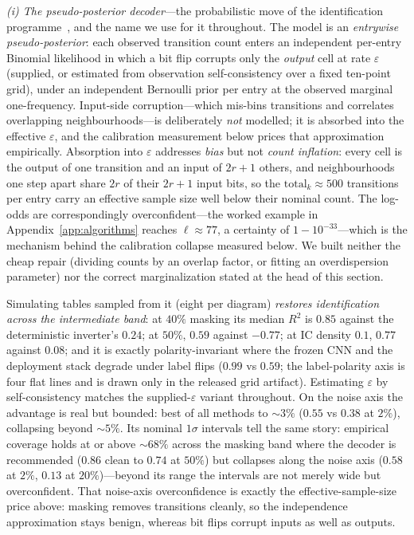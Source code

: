 \documentclass[aip,cha,amsmath,amssymb,reprint,floatfix]{revtex4-2}
\newcommand{\rtwo}{$R^2$}
\begin{document}
\emph{(i) The pseudo-posterior decoder}---the probabilistic move of the
identification programme~\cite{adamatzky1994}, and the name we use for it
throughout. The model is
an \emph{entrywise pseudo-posterior}: each observed transition count enters
an independent per-entry Binomial likelihood in which a bit flip corrupts
only the \emph{output} cell at rate $\varepsilon$ (supplied, or estimated
from observation self-consistency over a fixed ten-point grid), under an
independent Bernoulli prior per entry at the observed marginal
one-frequency. Input-side corruption---which mis-bins transitions and
correlates overlapping neighbourhoods---is deliberately \emph{not} modelled;
it is absorbed into the effective $\varepsilon$, and the calibration
measurement below prices that approximation empirically. Absorption into
$\varepsilon$ addresses \emph{bias} but not \emph{count inflation}: every cell
is the output of one transition and an input of $2r+1$ others, and
neighbourhoods one step apart share $2r$ of their $2r+1$ input bits, so the
$\mathrm{total}_k\approx500$ transitions per entry carry an effective sample
size well below their nominal count. The log-odds are correspondingly
overconfident---the worked example in Appendix~\ref{app:algorithms} reaches
$\ell\approx77$, a certainty of $1-10^{-33}$---which is the mechanism behind
the calibration collapse measured below. We built neither the cheap repair (dividing
counts by an overlap factor, or fitting an overdispersion parameter) nor the
correct marginalization stated at the head of this
section.

Simulating tables sampled from it (eight per diagram) \emph{restores
identification across the intermediate band}: at $40\%$ masking its median
\rtwo{} is $0.85$ against the deterministic inverter's $0.24$; at $50\%$,
$0.59$ against $-0.77$; at IC density $0.1$, $0.77$ against $0.08$; and it is
exactly polarity-invariant where the frozen CNN and the deployment stack
degrade under label flips
($0.99$ vs $0.59$; the label-polarity axis is four flat lines and is drawn
only in the released grid artifact). Estimating $\varepsilon$ by self-consistency matches the
supplied-$\varepsilon$ variant throughout. On the noise axis the advantage is
real but bounded: best of all methods to ${\sim}3\%$ ($0.55$ vs $0.38$ at
$2\%$), collapsing beyond ${\sim}5\%$. Its nominal $1\sigma$ intervals tell the
same story: empirical coverage holds at or above ${\sim}68\%$ across the
masking band where the decoder is recommended ($0.86$ clean to $0.74$ at
$50\%$) but collapses along the noise axis ($0.58$ at $2\%$, $0.13$ at
$20\%$)---beyond its range the intervals are not merely wide but
overconfident. That
noise-axis overconfidence is exactly the effective-sample-size price above:
masking removes transitions cleanly, so the independence approximation stays
benign, whereas bit flips corrupt inputs as well as outputs.
\end{document}
